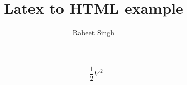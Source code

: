 \documentclass[]{article}
\title{Latex to HTML example}
\author{Rabeet Singh}
\begin{document}
\begin{equation}
-\frac{1}{2} \nabla^2
\end{equation}
\end{document}
